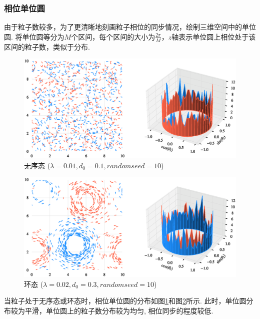 \documentclass{article}
\begin{document}
\subsubsection{相位单位圆}

由于粒子数较多，为了更清晰地刻画粒子相位的同步情况，绘制三维空间中的单位圆. 将单位圆等分为$M$个区间，每个区间的大小为$\frac{2\pi}{M}$，$z$轴表示单位圆上相位处于该区间的粒子数，类似于分布.

\begin{figure}[H]
	\centering
	\includegraphics[width=\textwidth]{./figs/CorrectCoupling_uniform_0.010_0.10.eps}
	\vspace{-1cm}
	\caption{无序态 ($\lambda=0.01, d_0=0.1, random seed=10$)}
	\label{fig:fig231.1}
\end{figure}

\begin{figure}[H]
	\centering
	\includegraphics[width=\textwidth]{./figs/CorrectCoupling_uniform_0.020_0.30.eps}
	\vspace{-1cm}
	\caption{环态 ($\lambda=0.02, d_0=0.3, random seed=10$)}
	\label{fig:fig231.2}
\end{figure}

当粒子处于无序态或环态时，相位单位圆的分布如图\ref{fig:fig231.1}和图\ref{fig:fig231.2}所示. 此时，单位圆分布较为平滑，单位圆上的粒子数分布较为均匀, 相位同步的程度较低.
\end{document}
